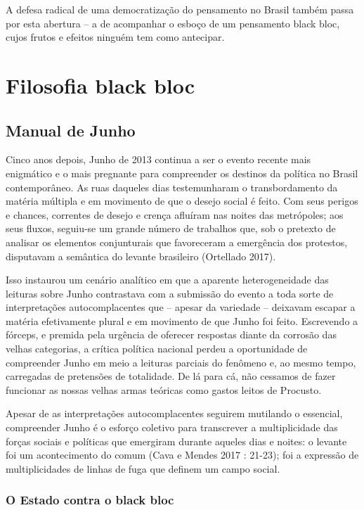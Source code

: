 A defesa radical de uma democratização do pensamento no Brasil também
passa por esta abertura -- a de acompanhar o esboço de um pensamento
black bloc, cujos frutos e efeitos ninguém tem como antecipar.

\part{Filosofia black bloc}

\chapter{Manual de Junho}

Cinco anos depois, Junho de 2013 continua a ser o evento recente mais
enigmático e o mais pregnante para compreender os destinos da política
no Brasil contemporâneo. As ruas daqueles dias testemunharam o
transbordamento da matéria múltipla e em movimento de que o desejo
social é feito. Com seus perigos e chances, correntes de desejo e crença
afluíram nas noites das metrópoles; aos seus fluxos, seguiu-se um grande
número de trabalhos que, sob o pretexto de analisar os elementos
conjunturais que favoreceram a emergência dos protestos, disputavam a
semântica do levante brasileiro (Ortellado 2017).

Isso instaurou um cenário analítico em que a aparente heterogeneidade
das leituras sobre Junho contrastava com a submissão do evento a toda
sorte de interpretações autocomplacentes que -- apesar da variedade --
deixavam escapar a matéria efetivamente plural e em movimento de que
Junho foi feito. Escrevendo a fórceps, e premida pela urgência de
oferecer respostas diante da corrosão das velhas categorias, a crítica
política nacional perdeu a oportunidade de compreender Junho em meio a
leituras parciais do fenômeno e, ao mesmo tempo, carregadas de
pretensões de totalidade. De lá para cá, não cessamos de fazer funcionar
as nossas velhas armas teóricas como gastos leitos de Procusto.

Apesar de as interpretações autocomplacentes seguirem mutilando o
essencial, compreender Junho é o esforço coletivo para transcrever a
multiplicidade das forças sociais e políticas que emergiram durante
aqueles dias e noites: o levante foi um acontecimento do comum (Cava e
Mendes 2017 : 21-23); foi a expressão de multiplicidades de linhas de
fuga que definem um campo social.

\section{O Estado contra o black bloc}

